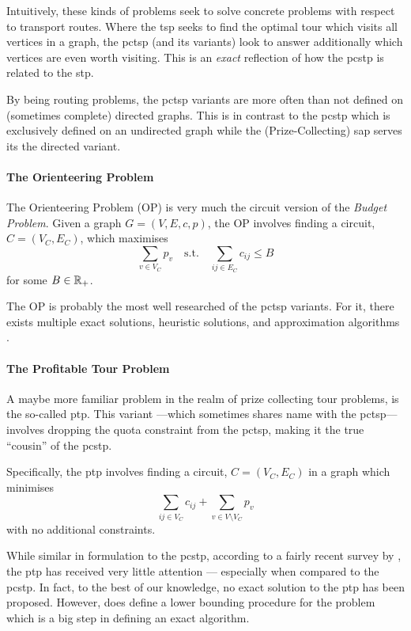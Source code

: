 Intuitively, these kinds of problems seek to solve concrete problems with respect to transport routes.
Where the \gls{tsp} seeks to find the optimal tour which visits all vertices in
a graph, the \gls{pctsp} (and its variants) look to answer additionally
which vertices are even worth visiting.
This is an \textit{exact} reflection of how the \gls{pcstp} is related
to the \gls{stp}.

By being routing problems, the \gls{pctsp} variants are more often than not
defined on (sometimes complete) directed graphs.
This is in
contrast to the \gls{pcstp} which is exclusively
defined on an undirected graph while the (Prize-Collecting)
\gls{sap} serves its the directed variant.

\paragraph{The Orienteering Problem}
The Orienteering Problem (OP) is very much the circuit version of the \textit{Budget Problem}.
Given a graph $G  = (V, E, c, p)$, the OP involves finding a circuit, $C = (V_C, E_C)$,
which maximises
\[\sum_{v \in V_C}  p_v \quad \text{s.t.} \quad \sum_{ij \in E_C} c_{ij} \leq B\]
for some $B \in \mathbb{R}_+$.

The OP is probably the most well researched of the \gls{pctsp} variants. For it, there exists
multiple exact solutions, heuristic solutions, and approximation algorithms
\citep{archetti2014chapter}.

\paragraph{The Profitable Tour Problem}
A maybe more familiar problem in the realm of prize collecting tour problems, is the
so-called \gls{ptp}. This variant ---which sometimes shares name with
the \gls{pctsp}--- involves dropping the quota constraint from the \gls{pctsp},
making it the true ``cousin'' of the \gls{pcstp}.

 Specifically, the \gls{ptp} involves finding a circuit,
 $C = (V_C, E_C)$ in a graph which minimises
 \[\sum_{ij \in V_C} c_{ij} + \sum_{v \in V \setminus V_C} p_v\]
 with no additional constraints.
 
 While similar in formulation to the \gls{pcstp}, according to a fairly recent survey by
 \citet{archetti2014chapter}, the \gls{ptp} has received very little attention
 --- especially when compared to the \gls{pcstp}.
 In fact, to the best of our knowledge, no exact solution to the \gls{ptp}
 has been proposed.
 However, \citet{dell1995prize} does define a lower bounding procedure for the problem
 which is a big step in defining an exact algorithm.
 
